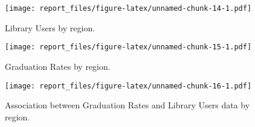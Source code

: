 \documentclass[12pt,]{article}
\begin{document}
\begin{figure}[htbp]
\centering
\texttt{[image: report\_files/figure-latex/unnamed-chunk-14-1.pdf]}
\caption{Library Users by region.}
\end{figure}

\vspace{0pt}

\vspace{20pt}

\begin{figure}[htbp]
\centering
\texttt{[image: report\_files/figure-latex/unnamed-chunk-15-1.pdf]}
\caption{Graduation Rates by region.}
\end{figure}

\vspace{0pt}

\vspace{20pt}

\begin{figure}[htbp]
\centering
\texttt{[image: report\_files/figure-latex/unnamed-chunk-16-1.pdf]}
\caption{Association between Graduation Rates and Library Users data by
region.}
\end{figure}

\vspace{0pt}




\newpage
\singlespacing 
\end{document}
